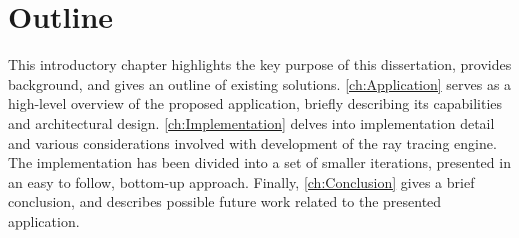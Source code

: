 \section{Outline}

This introductory chapter highlights the key purpose of this dissertation, provides background, and gives an outline of existing solutions. 
\cref{ch:Application} serves as a high-level overview of the proposed application, briefly describing its capabilities and architectural design. 
\cref{ch:Implementation} delves into implementation detail and various considerations involved with development of the ray tracing engine. 
The implementation has been divided into a set of smaller iterations, presented in an easy to follow, bottom-up approach.
Finally, \cref{ch:Conclusion} gives a brief conclusion, and describes possible future work related to the presented application.
